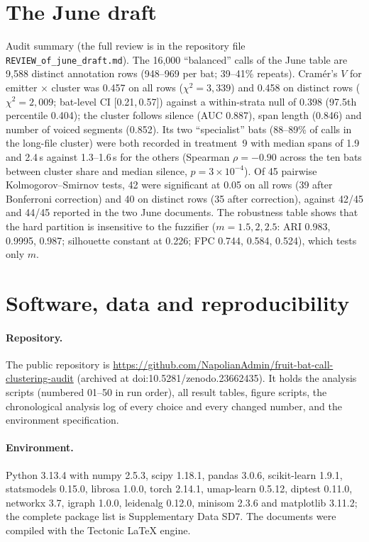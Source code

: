 \documentclass[11pt]{article}
\newcommand{\ci}[2]{[#1,\,#2]}
\begin{document}
\section{The June draft}
Audit summary (the full review is in the repository file \texttt{REVIEW\_of\_june\_draft.md}). The 16,000 ``balanced'' calls of the June table are 9,588 distinct annotation rows (948--969 per bat; 39--41\% repeats). Cram\'er's $V$ for emitter $\times$ cluster was 0.457 on all rows ($\chi^2=3{,}339$) and 0.458 on distinct rows ($\chi^2=2{,}009$; bat-level CI \ci{0.21}{0.57}) against a within-strata null of 0.398 (97.5th percentile 0.404); the cluster follows silence (AUC 0.887), span length (0.846) and number of voiced segments (0.852). Its two ``specialist'' bats (88--89\% of calls in the long-file cluster) were both recorded in treatment~9 with median spans of 1.9 and 2.4\,s against 1.3--1.6\,s for the others (Spearman $\rho=-0.90$ across the ten bats between cluster share and median silence, $p=3\times10^{-4}$). Of 45 pairwise Kolmogorov--Smirnov tests, 42 were significant at 0.05 on all rows (39 after Bonferroni correction) and 40 on distinct rows (35 after correction), against 42/45 and 44/45 reported in the two June documents. The robustness table shows that the hard partition is insensitive to the fuzzifier ($m=1.5, 2, 2.5$: ARI 0.983, 0.9995, 0.987; silhouette constant at 0.226; FPC 0.744, 0.584, 0.524), which tests only $m$.

\section{Software, data and reproducibility}
\paragraph{Repository.} The public repository is \url{https://github.com/NapolianAdmin/fruit-bat-call-clustering-audit} (archived at doi:10.5281/zenodo.23662435). It holds the analysis scripts (numbered 01--50 in run order), all result tables, figure scripts, the chronological analysis log of every choice and every changed number, and the environment specification.
\paragraph{Environment.} Python 3.13.4 with numpy 2.5.3, scipy 1.18.1, pandas 3.0.6, scikit-learn 1.9.1, statsmodels 0.15.0, librosa 1.0.0, torch 2.14.1, umap-learn 0.5.12, diptest 0.11.0, networkx 3.7, igraph 1.0.0, leidenalg 0.12.0, minisom 2.3.6 and matplotlib 3.11.2; the complete package list is Supplementary Data SD7. The documents were compiled with the Tectonic LaTeX engine.
\end{document}

